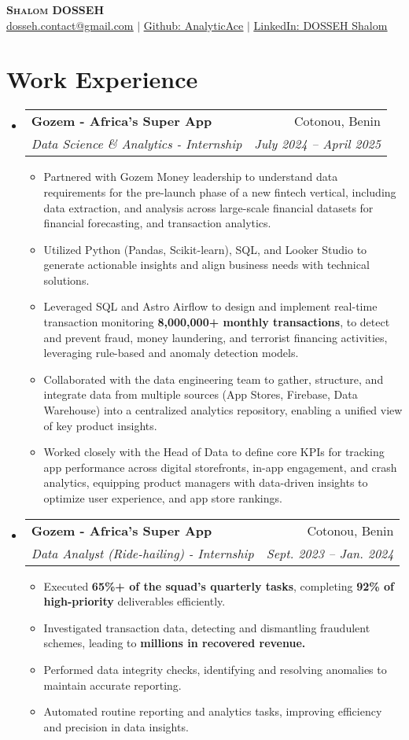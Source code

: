 \documentclass[letterpaper,11pt]{article}
\makeatletter
\newcommand{\resumeItem}[1]{
  \item\small{
    {#1 \vspace{-2pt}}
  }
}
\newcommand{\resumeSubheading}[4]{
  \vspace{-2pt}\item
    \begin{tabular*}{0.97\textwidth}[t]{l@{\extracolsep{\fill}}r}
      \textbf{#1} & #2 \\
      \textit{\small#3} & \textit{\small #4} \\
    \end{tabular*}\vspace{-7pt}
}
\newcommand{\resumeSubHeadingListStart}{\begin{itemize}[leftmargin=0.15in, label={}]}
\newcommand{\resumeSubHeadingListEnd}{\end{itemize}}
\newcommand{\resumeItemListStart}{\begin{itemize}}
\newcommand{\resumeItemListEnd}{\end{itemize}\vspace{-5pt}}
\makeatother
\begin{document}
\begin{center}
    \textbf{\Huge \scshape Shalom DOSSEH} \\ \vspace{1pt}
    \href{mailto:dosseh.contact@gmail.com}{\underline{dosseh.contact@gmail.com}} $|$ 
    \href{https://github.com/AnalyticAce}{\underline{Github: AnalyticAce}} $|$
    \href{https://www.linkedin.com/in/shalom-dosseh-4a484a262/}{\underline{LinkedIn: DOSSEH Shalom}}
\end{center}


\section{Work Experience}
  \resumeSubHeadingListStart
    \resumeSubheading
      {Gozem - Africa's Super App}{Cotonou, Benin}
      {Data Science \& Analytics - Internship}{July 2024 -- April 2025}
      \resumeItemListStart
        \resumeItem{Partnered with Gozem Money leadership to understand data requirements for the pre-launch phase of a new fintech vertical, including data extraction, and analysis across large-scale financial datasets for financial forecasting, and transaction analytics.}
        \resumeItem{Utilized Python (Pandas, Scikit-learn), SQL, and Looker Studio to generate actionable insights and align business needs with technical solutions.}
        \resumeItem{Leveraged SQL and Astro Airflow to design and implement real-time transaction monitoring \textbf{8,000,000+ monthly transactions}, to detect and prevent fraud, money laundering, and terrorist financing activities, leveraging rule-based and anomaly detection models.}
        \resumeItem{Collaborated with the data engineering team to gather, structure, and integrate data from multiple sources (App Stores, Firebase, Data Warehouse) into a centralized analytics repository, enabling a unified view of key product insights.}
        \resumeItem{Worked closely with the Head of Data to define core KPIs for tracking app performance across digital storefronts, in-app engagement, and crash analytics, equipping product managers with data-driven insights to optimize user experience, and app store rankings.}
      \resumeItemListEnd
    
    \resumeSubheading
      {Gozem - Africa's Super App}{Cotonou, Benin}
      {Data Analyst (Ride-hailing) - Internship}{Sept. 2023 -- Jan. 2024}
      \resumeItemListStart
        \resumeItem{Executed \textbf{65\%+ of the squad's quarterly tasks}, completing \textbf{92\% of high-priority} deliverables efficiently.}
        \resumeItem{Investigated transaction data, detecting and dismantling fraudulent schemes, leading to \textbf{millions in recovered revenue.}}
        \resumeItem{Performed data integrity checks, identifying and resolving anomalies to maintain accurate reporting.}
        \resumeItem{Automated routine reporting and analytics tasks, improving efficiency and precision in data insights.}
      \resumeItemListEnd
  \resumeSubHeadingListEnd
\end{document}

